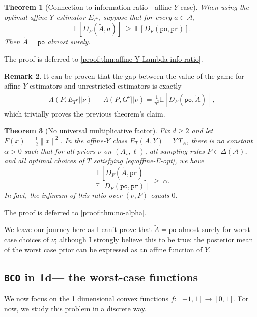 \documentclass{article}
\theoremstyle{plain}
\newtheorem{theorem}{Theorem}
\theoremstyle{definition}
\newtheorem{remark}[theorem]{Remark}
\newcommand{\pr}{\texttt{pr}}
\newcommand{\po}{\texttt{po}}
\newcommand{\E}{\mathbb E}
\newcommand{\cA}{\mathcal A}
\newcommand{\bco}{\texttt{BCO}\xspace}
\begin{document}
\begin{theorem}[Connection to information ratio---affine-\texorpdfstring{$Y$}{Y} case]\label{thm:affine-Y-Lambda-info-ratio}
    When using the optimal affine-$Y$ estimator $E_{T^\nu}$,
    suppose that for every $a \in \cA$,
    \[
        \E\!\left[D_F(\tilde{A}, a)\right] \;\ge\; \E\!\left[D_F(\po, \pr)\right].
    \]
    Then $\tilde{A} = \po$ almost surely.
\end{theorem}
\noindent The proof is deferred to \ref{proof:thm:affine-Y-Lambda-info-ratio}.
\begin{remark}
    It can be proven that the gap between the value of the game
    for affine-$Y$ estimators and unrestricted estimators is exactly
    \begin{align*}
        \Lambda(P, E_{T^\nu} || \nu)
         & -
        \Lambda(P, G^\nu|| \nu)
        =
        \frac{1}{\eta^2}
        \E\!\left[D_F(\po, \tilde{A})\right]
        \,,
    \end{align*}
    which trivially proves the previous theorem's claim.
\end{remark}

\begin{theorem}[No universal multiplicative factor]\label{thm:no-alpha}
    Fix $d\ge 2$ and let $F(x)=\tfrac12\|x\|^2$. In the affine-$Y$ class $E_T(A,Y)=Y\,T_A$,
    there is no constant $\alpha>0$ such that for all priors $\nu$ on $(A_\star,\ell)$, all sampling rules
    $P\in\Delta(\cA)$, and all optimal choices of $T$ satisfying \eqref{eq:affine-E-opt}, we have
    \[
        \frac{\E\!\left[D_F(\tilde{A},\pr)\right]}{\E\!\left[D_F(\po,\pr)\right]}\;\ge\;\alpha.
    \]
    In fact, the infimum of this ratio over $(\nu,P)$ equals $0$.
\end{theorem}
\noindent The proof is deferred to \ref{proof:thm:no-alpha}.

We leave our journey here as I can't prove that $\tilde{A} = \po$ almost surely
for worst-case choices of $\nu$; although I strongly believe this to be true:
the posterior mean of the worst case prior can be expressed as an affine function of $Y$.

\subsection{\bco in 1d--- the worst-case functions}
We now focus on the 1 dimensional convex functions $f: [-1,1] \to [0,1]$.
For now, we study this problem in a discrete way.
\end{document}
